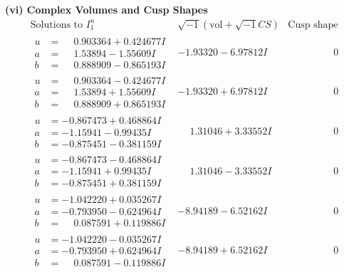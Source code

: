\documentclass[1p]{elsarticle_modified}
\theoremstyle{definition}
\newcommand{\I}{\sqrt{-1}}
\begin{document}
\newpage\flushleft \textbf{(vi) Complex Volumes and Cusp Shapes}
$$\begin{array}{c|c|c}  
\text{Solutions to }I^u_{1}& \I (\text{vol} + \sqrt{-1}CS) & \text{Cusp shape}\\
 \hline 
\begin{aligned}
u &= \phantom{-}0.903364 + 0.424677 I \\
a &= \phantom{-}1.53894 - 1.55609 I \\
b &= \phantom{-}0.888909 - 0.865193 I\end{aligned}
 & -1.93320 - 6.97812 I & \phantom{-0.000000 } 0 \\ \hline\begin{aligned}
u &= \phantom{-}0.903364 - 0.424677 I \\
a &= \phantom{-}1.53894 + 1.55609 I \\
b &= \phantom{-}0.888909 + 0.865193 I\end{aligned}
 & -1.93320 + 6.97812 I & \phantom{-0.000000 } 0 \\ \hline\begin{aligned}
u &= -0.867473 + 0.468864 I \\
a &= -1.15941 - 0.99435 I \\
b &= -0.875451 - 0.381159 I\end{aligned}
 & \phantom{-}1.31046 + 3.33552 I & \phantom{-0.000000 } 0 \\ \hline\begin{aligned}
u &= -0.867473 - 0.468864 I \\
a &= -1.15941 + 0.99435 I \\
b &= -0.875451 + 0.381159 I\end{aligned}
 & \phantom{-}1.31046 - 3.33552 I & \phantom{-0.000000 } 0 \\ \hline\begin{aligned}
u &= -1.042220 + 0.035267 I \\
a &= -0.793950 - 0.624964 I \\
b &= \phantom{-}0.087591 + 0.119886 I\end{aligned}
 & -8.94189 - 6.52162 I & \phantom{-0.000000 } 0 \\ \hline\begin{aligned}
u &= -1.042220 - 0.035267 I \\
a &= -0.793950 + 0.624964 I \\
b &= \phantom{-}0.087591 - 0.119886 I\end{aligned}
 & -8.94189 + 6.52162 I & \phantom{-0.000000 } 0 \\ \hline\begin{aligned}

\end{aligned}
\end{array}$$
\end{document}
